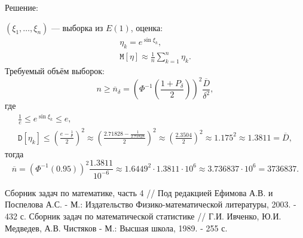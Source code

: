 \documentclass[a4paper,12pt]{article}
\newcommand{\expectation}[1]{\mathtt{M} \left[ #1 \right]}
\newcommand{\variance}[1]{\mathtt{D} \left[ #1 \right]}
\begin{document}
\begin{enumerate}
            Решение:

            $(\xi_1, \dots, \xi_n)$ --- выборка из $E(1)$, оценка:
            \begin{gather*}
                  \eta_k = e^{\sin \xi_k} , \\
                  \expectation{\eta} \approx \frac{1}{n} \sum_{k=1}^n \eta_k .
            \end{gather*}
            Требуемый объём выборок:
            \[
                  n
                  \ge \overline{n}_\delta
                  = \left( \Phi^{-1} \left( \frac{1 + P_\delta}{2} \right) \right)^2 \frac{\overline{D}}{\delta^2} ,
            \]
            где
            \begin{gather*}
                  \frac{1}{e} \le e^{\sin \xi_k} \le e, \\
                  \variance{\eta_k}
                  \le \left( \frac{e - \frac{1}{e}}{2} \right)^2
                  \approx \left( \frac{2.71828 - \frac{1}{2.71828}}{2} \right)^2
                  \approx \left( \frac{2.3504}{2} \right)^2
                  \approx 1.175^2
                  \approx 1.3811
                  = \overline{D} ,
            \end{gather*}
            тогда
            \[
                  \overline{n}
                  = \left( \Phi^{-1} \left( 0.95 \right) \right)^2 \frac{1.3811}{10^{-6}}
                  \approx 1.6449^2 \cdot 1.3811 \cdot 10^6
                  \approx 3.736837 \cdot 10^6
                  = 3 736 837 .
            \]

\end{enumerate}

\begin{thebibliography}{2}
       Сборник задач по математике, часть 4 // Под редакцией Ефимова А.В. и Поспелова А.С. - М.: Издательство Физико-математической
      литературы, 2003. - 432 с.
       Сборник задач по математической статистике // Г.И. Ивченко, Ю.И. Медведев, А.В. Чистяков - М.: Высшая школа, 1989. - 255 с.
\end{thebibliography}
\end{document}
